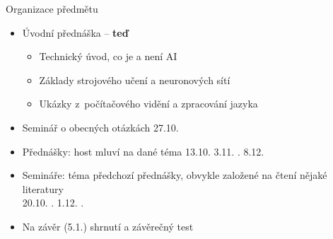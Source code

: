 \begin{frame}{Organizace předmětu}

    \begin{itemize}[<+->]

        \item Úvodní přednáška -- \textbf{teď}

        \begin{itemize}[<+->]

            \item Technický úvod, co je a není AI

            \item Základy strojového učení a neuronových sítí

            \item Ukázky z~počítačového vidění a zpracování jazyka

        \end{itemize}

		\item Seminář o obecných otázkách 27.10.

        \item Přednášky: host mluví na dané téma
            \hfill 13.10. \quad \phantom{0}3.11. . \quad \phantom{0}8.12.

        \item Semináře: téma předchozí přednášky, obvykle založené na čtení
            nějaké literatury \\
            \hfill 20.10. . \quad \phantom{0}1.12. .

        \item Na závěr (5.1.) shrnutí a závěrečný test

    \end{itemize}

    \vspace{5pt}

    \centering

\end{frame}

